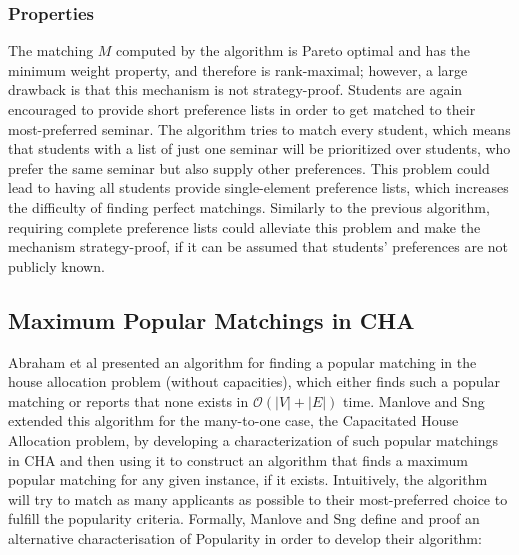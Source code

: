 \subsubsection{Properties}
The matching $M$ computed by the algorithm is Pareto optimal \cite{SngThesis} and has the minimum weight property, and therefore is rank-maximal;\cite{SngThesis} however, a large drawback is that this mechanism is not strategy-proof. Students are again encouraged to provide short preference lists in order to get matched to their most-preferred seminar. The algorithm tries to match every student, which means that students with a list of just one seminar will be prioritized over students, who prefer the same seminar but also supply other preferences. This problem could lead to having all students provide single-element preference lists, which increases the difficulty of finding perfect matchings. Similarly to the previous algorithm, requiring complete preference lists could alleviate this problem and make the mechanism strategy-proof, if it can be assumed that students' preferences are not publicly known.

\subsection{Maximum Popular Matchings in CHA}\label{algo-max-pop}
Abraham et al \cite{AbrahamPopular} presented an algorithm for finding a popular matching in the house allocation problem (without capacities), which either finds such a popular matching or reports that none exists in $\mathcal{O}(|V| + |E|)$ time. Manlove and Sng \cite{ManlovePopularMatchings} extended this algorithm for the many-to-one case, the Capacitated House Allocation problem, by developing a characterization of such popular matchings in CHA and then using it to construct an algorithm that finds a maximum popular matching for any given instance, if it exists. 
Intuitively, the algorithm will try to match as many applicants as possible to their most-preferred choice to fulfill the popularity criteria. Formally, Manlove and Sng \cite{ManlovePopularMatchings} define and proof an alternative characterisation of Popularity in order to develop their algorithm:

